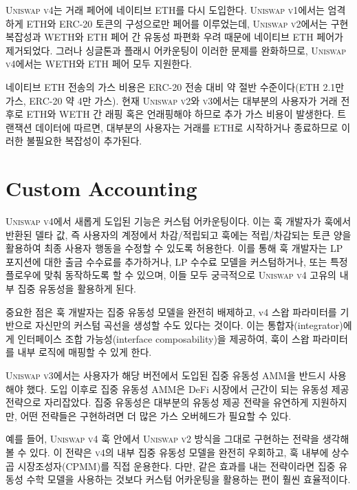 \documentclass[sigconf,nonacm,prologue,table]{acmart}
\numberwithin{equation}{section}
\theoremstyle{definition}
\theoremstyle{remark}
\begin{document}
\textsc{Uniswap v4}는 거래 페어에 네이티브 ETH를 다시 도입한다. \textsc{Uniswap v1}에서는 엄격하게 ETH와 ERC-20 토큰의 구성으로만 페어를 이루었는데, \textsc{Uniswap v2}에서는 구현 복잡성과 WETH와 ETH 페어 간 유동성 파편화 우려 때문에 네이티브 ETH 페어가 제거되었다. 그러나 싱글톤과 플래시 어카운팅이 이러한 문제를 완화하므로, \textsc{Uniswap v4}에서는 WETH와 ETH 페어 모두 지원한다.

네이티브 ETH 전송의 가스 비용은 ERC-20 전송 대비 약 절반 수준이다(ETH 2.1만 가스, ERC-20 약 4만 가스). 현재 \textsc{Uniswap v2}와 \textsc{v3}에서는 대부분의 사용자가 거래 전후로 ETH와 WETH 간 래핑 혹은 언래핑해야 하므로 추가 가스 비용이 발생한다. 트랜잭션 데이터에 따르면, 대부분의 사용자는 거래를 ETH로 시작하거나 종료하므로 이러한 불필요한 복잡성이 추가된다.

\section{Custom Accounting} 
\label{customaccounting}

\textsc{Uniswap v4}에서 새롭게 도입된 기능은 커스텀 어카운팅이다. 이는 훅 개발자가 훅에서 반환된 델타 값, 즉 사용자의 계정에서 차감/적립되고 훅에는 적립/차감되는 토큰 양을 활용하여 최종 사용자 행동을 수정할 수 있도록 허용한다. 이를 통해 훅 개발자는 LP 포지션에 대한 출금 수수료를 추가하거나, LP 수수료 모델을 커스텀하거나, 또는 특정 플로우에 맞춰 동작하도록 할 수 있으며, 이들 모두 궁극적으로 \textsc{Uniswap v4} 고유의 내부 집중 유동성을 활용하게 된다.

중요한 점은 훅 개발자는 집중 유동성 모델을 완전히 배제하고, v4 스왑 파라미터를 기반으로 자신만의 커스텀 곡선을 생성할 수도 있다는 것이다. 이는 통합자(integrator)에게 인터페이스 조합 가능성(interface composability)을 제공하여, 훅이 스왑 파라미터를 내부 로직에 매핑할 수 있게 한다.

\textsc{Uniswap v3}에서는 사용자가 해당 버전에서 도입된 집중 유동성 AMM을 반드시 사용해야 했다. 도입 이후로 집중 유동성 AMM은 DeFi 시장에서 근간이 되는 유동성 제공 전략으로 자리잡았다. 집중 유동성은 대부분의 유동성 제공 전략을 유연하게 지원하지만, 어떤 전략들은 구현하려면 더 많은 가스 오버헤드가 필요할 수 있다.

예를 들어, \textsc{Uniswap v4} 훅 안에서 \textsc{Uniswap v2} 방식을 그대로 구현하는 전략을 생각해볼 수 있다. 이 전략은 \textsc{v4}의 내부 집중 유동성 모델을 완전히 우회하고, 훅 내부에 상수 곱 시장조성자(CPMM)를 직접 운용한다. 다만, 같은 효과를 내는 전략이라면 집중 유동성 수학 모델을 사용하는 것보다 커스텀 어카운팅을 활용하는 편이 훨씬 효율적이다.
\end{document}

